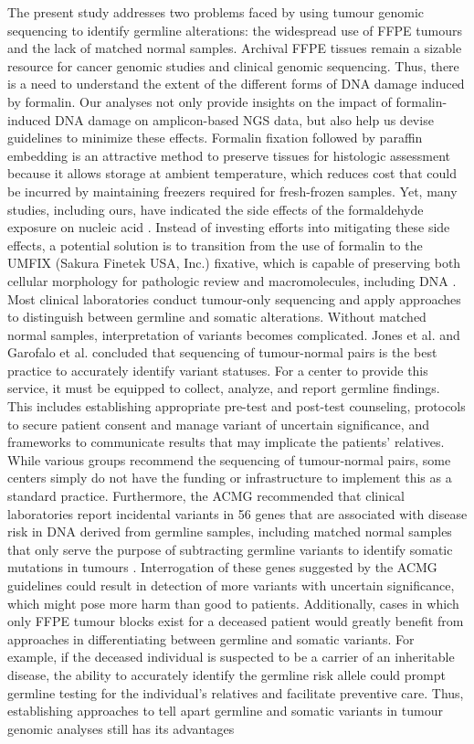 The present study addresses two problems faced by using tumour genomic sequencing to identify germline alterations: the widespread use of FFPE tumours and the lack of matched normal samples. Archival FFPE tissues remain a sizable resource for cancer genomic studies and clinical genomic sequencing. Thus, there is a need to understand the extent of the different forms of DNA damage induced by formalin. Our analyses not only provide insights on the impact of formalin-induced DNA damage on amplicon-based NGS data, but also help us devise guidelines to minimize these effects. Formalin fixation followed by paraffin embedding is an attractive method to preserve tissues for histologic assessment because it allows storage at ambient temperature, which reduces cost that could be incurred by maintaining freezers required for fresh-frozen samples. Yet, many studies, including ours, have indicated the side effects of the formaldehyde exposure on nucleic acid \cite{Do2015a, Kim2017, Ofner2017, Oh2015, Wong2013, Wong2014, Sikorsky2007}. Instead of investing efforts into mitigating these side effects, a potential solution is to transition from the use of formalin to the UMFIX (Sakura Finetek USA, Inc.) fixative, which is capable of preserving both cellular morphology for pathologic review and macromolecules, including DNA \cite{Vincek2003}. Most clinical laboratories conduct tumour-only sequencing and apply approaches to distinguish between germline and somatic alterations. Without matched normal samples, interpretation of variants becomes complicated. Jones et al. \cite{Jones2015a} and Garofalo et al. \cite{Garofalo2016} concluded that sequencing of tumour-normal pairs is the best practice to accurately identify variant statuses. For a center to provide this service, it must be equipped to collect, analyze, and report germline findings. This includes establishing appropriate pre-test and post-test counseling, protocols to secure patient consent and manage variant of uncertain significance, and frameworks to communicate results that may implicate the patients' relatives. While various groups recommend the sequencing of tumour-normal pairs, some centers simply do not have the funding or infrastructure to implement this as a standard practice. Furthermore, the ACMG recommended that clinical laboratories report incidental variants in 56 genes that are associated with disease risk in DNA derived from germline samples, including matched normal samples that only serve the purpose of subtracting germline variants to identify somatic mutations in tumours \cite{Green2013}. Interrogation of these genes suggested by the ACMG guidelines could result in detection of more variants with uncertain significance, which might pose more harm than good to patients. Additionally, cases in which only FFPE tumour blocks exist for a deceased patient would greatly benefit from approaches in differentiating between germline and somatic variants. For example, if the deceased individual is suspected to be a carrier of an inheritable disease, the ability to accurately identify the germline risk allele could prompt germline testing for the individual's relatives and facilitate preventive care. Thus, establishing approaches to tell apart germline and somatic variants in tumour genomic analyses still has its advantages 